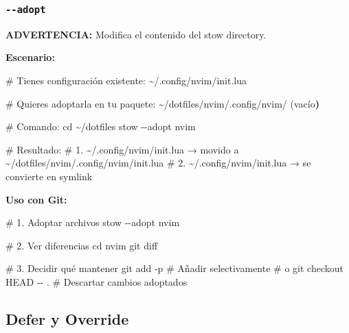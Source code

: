 \documentclass[
  doc,
  floatsintext,
  longtable,
  a4paper,
  nolmodern,
  notxfonts,
  notimes,
  12pt,
  colorlinks=true,linkcolor=blue,citecolor=blue,urlcolor=blue]{apa7}
\newenvironment{Shaded}{\begin{snugshade}}{\end{snugshade}}
\newcommand{\AttributeTok}[1]{\textcolor[rgb]{0.40,0.45,0.13}{#1}}
\newcommand{\BuiltInTok}[1]{\textcolor[rgb]{0.00,0.23,0.31}{#1}}
\newcommand{\CommentTok}[1]{\textcolor[rgb]{0.37,0.37,0.37}{#1}}
\newcommand{\ErrorTok}[1]{\textcolor[rgb]{0.68,0.00,0.00}{#1}}
\newcommand{\ExtensionTok}[1]{\textcolor[rgb]{0.00,0.23,0.31}{#1}}
\newcommand{\FunctionTok}[1]{\textcolor[rgb]{0.28,0.35,0.67}{#1}}
\newcommand{\KeywordTok}[1]{\textcolor[rgb]{0.00,0.23,0.31}{\textbf{#1}}}
\newcommand{\NormalTok}[1]{\textcolor[rgb]{0.00,0.23,0.31}{#1}}
\begin{document}
\subsubsection{\texorpdfstring{\texttt{-\/-adopt}}{-\/-adopt}}\label{adopt}

\textbf{ADVERTENCIA:} Modifica el contenido del stow directory.

\textbf{Escenario:}

\begin{Shaded}
\begin{Highlighting}[]
\CommentTok{\# Tienes configuración existente:}
\ExtensionTok{\textasciitilde{}/.config/nvim/init.lua}

\CommentTok{\# Quieres adoptarla en tu paquete:}
\ExtensionTok{\textasciitilde{}/dotfiles/nvim/.config/nvim/}  \ErrorTok{(}\ExtensionTok{vacío}\KeywordTok{)}

\CommentTok{\# Comando:}
\BuiltInTok{cd}\NormalTok{ \textasciitilde{}/dotfiles}
\ExtensionTok{stow} \AttributeTok{{-}{-}adopt}\NormalTok{ nvim}

\CommentTok{\# Resultado:}
\CommentTok{\# 1. \textasciitilde{}/.config/nvim/init.lua → movido a \textasciitilde{}/dotfiles/nvim/.config/nvim/init.lua}
\CommentTok{\# 2. \textasciitilde{}/.config/nvim/init.lua → se convierte en symlink}
\end{Highlighting}
\end{Shaded}

\textbf{Uso con Git:}

\begin{Shaded}
\begin{Highlighting}[]
\CommentTok{\# 1. Adoptar archivos}
\ExtensionTok{stow} \AttributeTok{{-}{-}adopt}\NormalTok{ nvim}

\CommentTok{\# 2. Ver diferencias}
\BuiltInTok{cd}\NormalTok{ nvim}
\FunctionTok{git}\NormalTok{ diff}

\CommentTok{\# 3. Decidir qué mantener}
\FunctionTok{git}\NormalTok{ add }\AttributeTok{{-}p}  \CommentTok{\# Añadir selectivamente}
\CommentTok{\# o}
\FunctionTok{git}\NormalTok{ checkout HEAD }\AttributeTok{{-}{-}}\NormalTok{ .  }\CommentTok{\# Descartar cambios adoptados}
\end{Highlighting}
\end{Shaded}

\subsection{Defer y Override}\label{defer-y-override}
\end{document}
